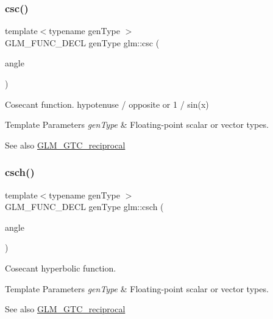 \subsubsection{\texorpdfstring{csc()}{csc()}}
{\footnotesize\ttfamily template$<$typename gen\+Type $>$ \\
G\+L\+M\+\_\+\+F\+U\+N\+C\+\_\+\+D\+E\+CL gen\+Type glm\+::csc (\begin{DoxyParamCaption}\item[{gen\+Type}]{angle }\end{DoxyParamCaption})}

Cosecant function. hypotenuse / opposite or 1 / sin(x)


\begin{DoxyTemplParams}{Template Parameters}
{\em gen\+Type} & Floating-\/point scalar or vector types.\\
\hline
\end{DoxyTemplParams}
\begin{DoxySeeAlso}{See also}
\hyperlink{group__gtc__reciprocal}{G\+L\+M\+\_\+\+G\+T\+C\+\_\+reciprocal} 
\end{DoxySeeAlso}
\mbox{\label{group__gtc__reciprocal_ga6d95843ff3ca6472ab399ba171d290a0}} 
\subsubsection{\texorpdfstring{csch()}{csch()}}
{\footnotesize\ttfamily template$<$typename gen\+Type $>$ \\
G\+L\+M\+\_\+\+F\+U\+N\+C\+\_\+\+D\+E\+CL gen\+Type glm\+::csch (\begin{DoxyParamCaption}\item[{gen\+Type}]{angle }\end{DoxyParamCaption})}

Cosecant hyperbolic function.


\begin{DoxyTemplParams}{Template Parameters}
{\em gen\+Type} & Floating-\/point scalar or vector types.\\
\hline
\end{DoxyTemplParams}
\begin{DoxySeeAlso}{See also}
\hyperlink{group__gtc__reciprocal}{G\+L\+M\+\_\+\+G\+T\+C\+\_\+reciprocal} 
\end{DoxySeeAlso}
\mbox{\label{group__gtc__reciprocal_gae4bcbebee670c5ea155f0777b3acbd84}} 
